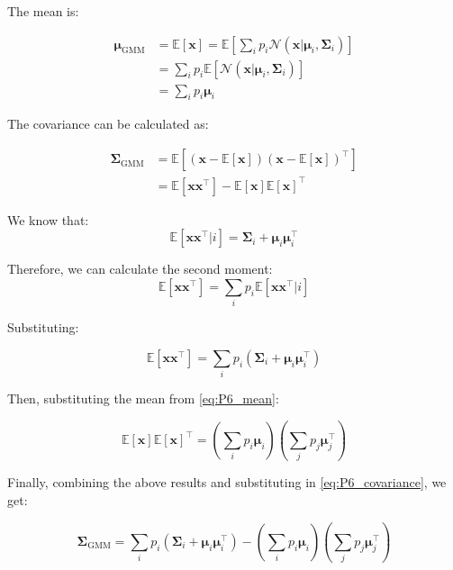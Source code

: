 \documentclass{article}
\begin{document}
The mean is:

\begin{equation} \label{eq:P6_mean}
\begin{aligned}    
    \boldsymbol{\mu}_{\text{GMM}} &=
    \mathbb{E}[\mathbf{x}] =
    \mathbb{E}[
    \sum_i p_i \mathcal{N}(\mathbf{x} | \boldsymbol{\mu}_i, \boldsymbol{\Sigma}_i)] \\&=
    \sum_i p_i \mathbb{E}[
     \mathcal{N}(\mathbf{x} | \boldsymbol{\mu}_i, \boldsymbol{\Sigma}_i)] \\&=
    \sum_i p_i \boldsymbol{\mu}_i
\end{aligned}
\end{equation}

The covariance can be calculated as:

\begin{equation} \label{eq:P6_covariance}
\begin{aligned}
    \boldsymbol{\Sigma}_{\text{GMM}} &= \mathbb{E}[(\mathbf{x} - \mathbb{E}[\mathbf{x}])(\mathbf{x} - \mathbb{E}[\mathbf{x}])^\top]
\\ &= \mathbb{E}[\mathbf{x} \mathbf{x}^\top] - \mathbb{E}[\mathbf{x}] \mathbb{E}[\mathbf{x}]^\top
\end{aligned}
\end{equation}


We know that:
\begin{equation*}
    \mathbb{E}[\mathbf{x} \mathbf{x}^\top | i] = \boldsymbol{\Sigma}_i + \boldsymbol{\mu}_i \boldsymbol{\mu}_i^\top
\end{equation*}

Therefore, we can calculate the second moment:
\begin{equation*}
    \mathbb{E}[\mathbf{x} \mathbf{x}^\top] = \sum_i p_i \mathbb{E}[\mathbf{x} \mathbf{x}^\top | i]
\end{equation*}

Substituting:

\begin{equation*}
    \mathbb{E}[\mathbf{x} \mathbf{x}^\top] = \sum_i p_i (\boldsymbol{\Sigma}_i + \boldsymbol{\mu}_i \boldsymbol{\mu}_i^\top)
\end{equation*}

Then, substituting the mean from \eqref{eq:P6_mean}:

\begin{equation*}
    \mathbb{E}[\mathbf{x}] \mathbb{E}[\mathbf{x}]^\top = \left( \sum_i p_i \boldsymbol{\mu}_i \right) \left( \sum_j p_j \boldsymbol{\mu}_j^\top \right)
\end{equation*}

Finally, combining the above results and substituting in \eqref{eq:P6_covariance}, we get:

\begin{equation*}
    \boldsymbol{\Sigma}_{\text{GMM}} = \sum_i p_i (\boldsymbol{\Sigma}_i + \boldsymbol{\mu}_i \boldsymbol{\mu}_i^\top) - \left( \sum_i p_i \boldsymbol{\mu}_i \right) \left( \sum_j p_j \boldsymbol{\mu}_j^\top \right)
\end{equation*}
\end{document}
